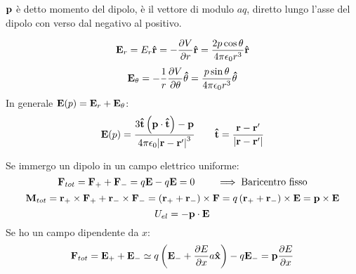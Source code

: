 \documentclass[12pt,a4paper]{article}
\begin{document}
\begin{definition}
    $\vb{p}$ è detto momento del dipolo, è il vettore di modulo $aq$, diretto lungo l'asse del dipolo con verso dal negativo al positivo.

\end{definition}

\begin{equation*}
    \vb{E}_r=E_r\vu{r}=-\pdv{V}{r}\vu{r}= \frac{2 p \cos \theta}{4\pi\epsilon_0r^3}\vu{r}
\end{equation*}
\begin{equation*}
    \vb{E}_\theta = -\frac{1}{r}\pdv{V}{\theta}\vu{\theta}= \frac{p \sin \theta}{4\pi\epsilon_0r^3}\vu{\theta}
\end{equation*}
In generale $\vb{E}(p)=\vb{E}_r+\vb{E}_\theta$:
\begin{equation*}
    \vb{E}(p)=\frac{3\vu{t}\left( \vb{p}\cdot\vu{t} \right)-\vb{p}}{4\pi\epsilon_0\abs{\vb{r}-\vb{r}'}^3} \quad \quad 
    \vu{t} = \frac{\vb{r}-\vb{r}'}{\abs{\vb{r}-\vb{r}'}}
\end{equation*}

Se immergo un dipolo in un campo elettrico uniforme:
\begin{equation*}
    \vb{F}_{tot} = \vb{F}_+ +\vb{F}_-= q\vb{E}-q\vb{E}=0  \quad \quad \implies \text{Baricentro fisso}
\end{equation*}
\begin{equation*}
    \vb{M}_{tot}= \vb{r}_+\times\vb{F}_+ + \vb{r}_-\times\vb{F}_-=\left( \vb{r}_++\vb{r}_- \right) \times\vb{F}=
     q\left( \vb{r}_++\vb{r}_- \right) \times\vb{E}= \vb{p}\times\vb{E}
\end{equation*}
\begin{equation*}
    U_{el}= -\vb{p}\cdot\vb{E}
\end{equation*}
Se ho un campo dipendente da $x$:
\begin{equation*}
    \vb{F}_{tot} = \vb{E}_+ +\vb{E}_-\simeq q\left( \vb{E}_- + \pdv{E}{x}a\vu{x} \right)-q\vb{E}_-= \vb{p}\pdv{E}{x}
\end{equation*}
\end{document}
